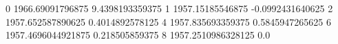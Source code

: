0 1966.69091796875 9.4398193359375
1 1957.15185546875 -0.0992431640625
2 1957.652587890625 0.4014892578125
4 1957.835693359375 0.5845947265625
6 1957.4696044921875 0.218505859375
8 1957.2510986328125 0.0
